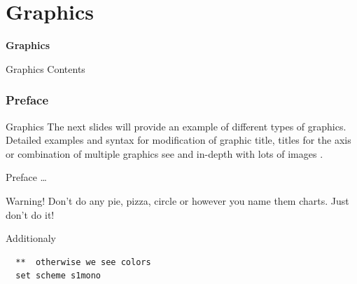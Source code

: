 

\part{Graphics}
\begin{frame}
\thispagestyle{empty}
\textbf{\huge{Graphics}}
\end{frame}

\begin{frame}{Graphics Contents}
 \tableofcontents
\end{frame}


\section{Preface}
\begin{frame}{Graphics}
 The next slides will provide an example of different types of graphics. Detailed examples and syntax for modification of graphic title, titles for the axis or combination of multiple graphics see \textcite[Chap. 6]{Kohler12en} and in-depth with lots of images \textcite{Mitchell2012}.
\end{frame}

\begin{frame}[fragile]{Preface \dots}
\begin{alertblock}{Warning!}
Don't do any pie, pizza, circle or however you name them charts. Just don't do it!
\end{alertblock}
\end{frame}

\begin{frame}[fragile]{Additionaly}  
  \begin{lstlisting}
  **  otherwise we see colors
  set scheme s1mono
 \end{lstlisting}
\end{frame}

